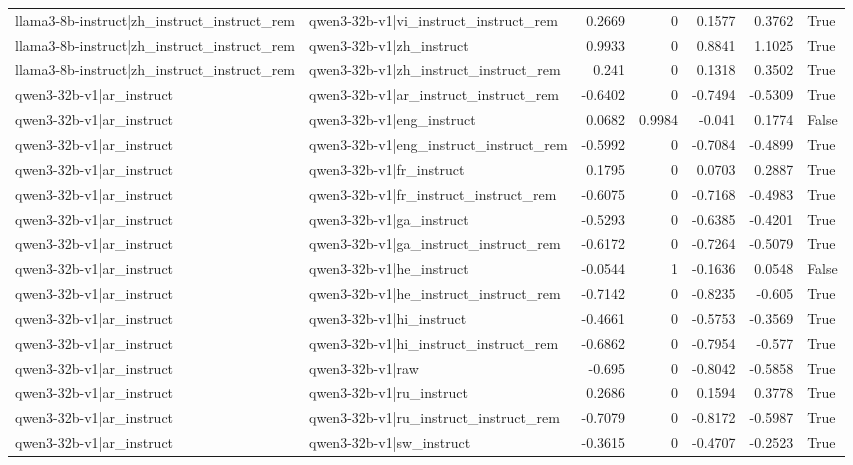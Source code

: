 \begin{table}
\begin{tabular}{l l r r r r l}
llama3-8b-instruct|zh_instruct_instruct_rem & qwen3-32b-v1|vi_instruct_instruct_rem & 0.2669 & 0 & 0.1577 & 0.3762 & True \\
llama3-8b-instruct|zh_instruct_instruct_rem & qwen3-32b-v1|zh_instruct & 0.9933 & 0 & 0.8841 & 1.1025 & True \\
llama3-8b-instruct|zh_instruct_instruct_rem & qwen3-32b-v1|zh_instruct_instruct_rem & 0.241 & 0 & 0.1318 & 0.3502 & True \\
qwen3-32b-v1|ar_instruct & qwen3-32b-v1|ar_instruct_instruct_rem & -0.6402 & 0 & -0.7494 & -0.5309 & True \\
qwen3-32b-v1|ar_instruct & qwen3-32b-v1|eng_instruct & 0.0682 & 0.9984 & -0.041 & 0.1774 & False \\
qwen3-32b-v1|ar_instruct & qwen3-32b-v1|eng_instruct_instruct_rem & -0.5992 & 0 & -0.7084 & -0.4899 & True \\
qwen3-32b-v1|ar_instruct & qwen3-32b-v1|fr_instruct & 0.1795 & 0 & 0.0703 & 0.2887 & True \\
qwen3-32b-v1|ar_instruct & qwen3-32b-v1|fr_instruct_instruct_rem & -0.6075 & 0 & -0.7168 & -0.4983 & True \\
qwen3-32b-v1|ar_instruct & qwen3-32b-v1|ga_instruct & -0.5293 & 0 & -0.6385 & -0.4201 & True \\
qwen3-32b-v1|ar_instruct & qwen3-32b-v1|ga_instruct_instruct_rem & -0.6172 & 0 & -0.7264 & -0.5079 & True \\
qwen3-32b-v1|ar_instruct & qwen3-32b-v1|he_instruct & -0.0544 & 1 & -0.1636 & 0.0548 & False \\
qwen3-32b-v1|ar_instruct & qwen3-32b-v1|he_instruct_instruct_rem & -0.7142 & 0 & -0.8235 & -0.605 & True \\
qwen3-32b-v1|ar_instruct & qwen3-32b-v1|hi_instruct & -0.4661 & 0 & -0.5753 & -0.3569 & True \\
qwen3-32b-v1|ar_instruct & qwen3-32b-v1|hi_instruct_instruct_rem & -0.6862 & 0 & -0.7954 & -0.577 & True \\
qwen3-32b-v1|ar_instruct & qwen3-32b-v1|raw & -0.695 & 0 & -0.8042 & -0.5858 & True \\
qwen3-32b-v1|ar_instruct & qwen3-32b-v1|ru_instruct & 0.2686 & 0 & 0.1594 & 0.3778 & True \\
qwen3-32b-v1|ar_instruct & qwen3-32b-v1|ru_instruct_instruct_rem & -0.7079 & 0 & -0.8172 & -0.5987 & True \\
qwen3-32b-v1|ar_instruct & qwen3-32b-v1|sw_instruct & -0.3615 & 0 & -0.4707 & -0.2523 & True \\

\end{tabular}
\end{table}

